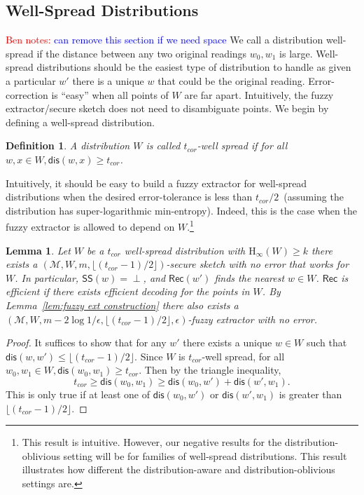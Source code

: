 \documentclass[11pt]{article}
\newcommand{\lemref}[1]{\mbox{Lemma~\ref{#1}}}
\newcommand{\class}[1]{{\ensuremath{\mathsf{#1}}}}
\newcommand{\sketch}{\ensuremath{\class{SS}}\xspace}
\newcommand{\rec}{\ensuremath{\class{Rec}}\xspace}
\newcommand{\dis}{\ensuremath{\mathsf{dis}}}
\newcommand{\Hoo}{\mathrm{H}_\infty}
\newtheorem{lemma}[theorem]{Lemma}
\newtheorem{definition}[theorem]{Definition}
\newcommand{\authnote}[2]{{\textcolor{red}{\textsf{#1 notes: }\textcolor{blue}{ #2}}\marginpar{\textcolor{red}{\textbf{!!!!!}}}}}
\newcommand{\authnote}[2]{}
\newcommand{\bnote}[1]{{\authnote{Ben}{#1}}}
\begin{document}
\subsection{Well-Spread Distributions}
\bnote{can remove this section if we need space}
We call a distribution well-spread if the distance between any two original readings $w_0, w_1$ is large.  Well-spread distributions should be the easiest type of distribution to handle as given a particular $w'$ there is a unique $w$ that could be the original reading.  Error-correction is ``easy'' when all points of $W$ are far apart.  Intuitively, the fuzzy extractor/secure sketch does not need to disambiguate points.  %
We begin by defining a well-spread distribution.

\begin{definition}
A distribution $W$ is called \emph{$t_{cor}$-well spread} if for all $w, x\in W, \dis(w, x)\ge t_{cor}$.
\end{definition}
Intuitively, it should be easy to build a fuzzy extractor for well-spread distributions when the desired error-tolerance is less than $t_{cor}/2$~(assuming the distribution has super-logarithmic min-entropy).  Indeed, this is the case when the fuzzy extractor is allowed to depend on $W$.\footnote{This result is intuitive.  However, our negative results for the distribution-oblivious setting will be for families of well-spread distributions.  This result illustrates how different the distribution-aware and distribution-oblivious settings are.}
\begin{lemma}
\label{lem:nosketchwellspread}
Let $W$ be a $t_{cor}$ well-spread distribution with $\Hoo(W)\ge k$ there exists a $(\mathcal{M}, W, m, \lfloor( t_{cor}-1)/2\rfloor)$-secure sketch with no error that works for $W$.  In particular, $\sketch(w) = \perp$, and $\rec(w')$ finds the nearest $w\in W$.  \rec is efficient if there exists efficient decoding for the points in $W$.  By \lemref{lem:fuzzy ext construction} there also exists a $(\mathcal{M}, W,m -2\log 1/\epsilon, \lfloor (t_{cor}-1)/2\rfloor, \epsilon)$-fuzzy extractor with no error.
\end{lemma}  
\begin{proof}
It suffices to show that for any $w'$ there exists a unique $w\in W$ such that $\dis (w, w')\le \lfloor (t_{cor}-1)/2\rfloor$.  Since $W$ is $t_{cor}$-well spread, for all $w_0, w_1 \in W, \dis (w_0, w_1)\ge t_{cor}$.  Then by the triangle inequality,
\[
t_{cor}\ge \dis(w_0, w_1) \ge \dis(w_0, w') + \dis(w', w_1).\]
This is only true if at least one of $\dis(w_0, w')$ or $\dis(w', w_1)$ is greater than $\lfloor (t_{cor}-1)/2\rfloor$.
\end{proof}
\end{document}
